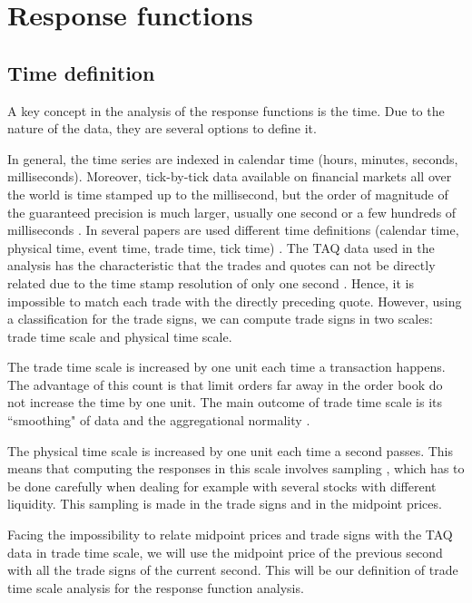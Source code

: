 \section{Response functions}

\subsection{Time definition}\label{subsec:time_definition}

A key concept in the analysis of the response functions is the time. Due to the
nature of the data, they are several options to define it.

In general, the time series are indexed in calendar time (hours, minutes,
seconds, milliseconds). Moreover, tick-by-tick data available on financial
markets all over the world is time stamped up to the millisecond, but the order
of magnitude of the guaranteed precision is much larger, usually one second or
a few hundreds of milliseconds \cite{empirical_facts,market_digest}. In several papers are
used different time definitions (calendar time, physical time, event time,
trade time, tick time) \cite{empirical_facts,sampling_returns,market_making}.
The TAQ data used in the analysis has the characteristic that the trades and
quotes can not be directly related due to the time stamp resolution of only one
second \cite{Wang_2016_cross}. Hence, it is impossible to match each trade with
the directly preceding quote. However, using a classification for the trade
signs, we can compute trade signs in two scales: trade time scale and physical
time scale.

The trade time scale is increased by one unit each time a transaction happens.
The advantage of this count is that limit orders far away in the order book do
not increase the time by one unit. The main outcome of trade time scale is its
``smoothing" of data and the aggregational normality \cite{empirical_facts}.

The physical time scale is increased by one unit each time a second passes.
This means that computing the responses in this scale involves sampling
\cite{sampling_returns,Wang_2016_cross}, which has to be done carefully when
dealing for example with several stocks with different liquidity. This sampling
is made in the trade signs and in the midpoint prices.

Facing the impossibility to relate midpoint prices and trade signs with the TAQ
data in trade time scale, we will use the midpoint price of the previous second
with all the trade signs of the current second. This will be our definition of
trade time scale analysis for the response function analysis.

